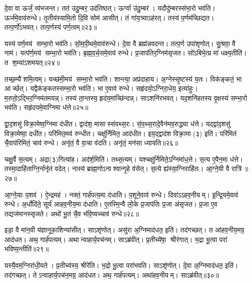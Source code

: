दे॒वा वा ऊर्जं॒ व्य॑भजन्त। तत॑ उदु॒म्बर॒ उद॑तिष्ठत्। ऊर्ग्वा उ॑दु॒म्बर॑। यदौदु॑म्बरस्संभा॒रो भव॑ति। ऊर्ज॑मे॒वाव॑रुन्धे। तृ॒तीय॑स्यामि॒तो दि॒वि सोम॑ आसीत्। तं गा॑य॒त्र्याऽह॑रत्। तस्य॑ प॒र्णम॑च्छिद्यत। तत्प॒र्णो॑ऽभवत्। तत्प॒र्णस्य॑ पर्ण॒त्वम्॥२३॥

यस्य॑ पर्ण॒मय॑ सम्भा॒रो भव॑ति। सो॒म॒पी॒थमे॒वाव॑रुन्धे। दे॒वा वै ब्रह्म॑न्नवदन्त। तत्प॒र्ण उपा॑शृणोत्। सु॒श्रवा॒ वै नाम॑। यत्प॑र्ण॒मय॑ सम्भा॒रो भव॑ति। ब्र॒ह्म॒व॒र्च॒समे॒वाव॑ रुन्धे। प्र॒जाप॑तिर॒ग्निम॑सृजत। सो॑ऽबिभे॒त्प्र मा॑ धक्ष्य॒तीति॑। त श॒म्या॑ऽशमयत्॥२४॥

तच्छ॒म्यै॑ शमि॒त्वम्। यच्छ॑मी॒मय॑ सम्भा॒रो भव॑ति। शान्त्या॒ अप्र॑दाहाय। अ॒ग्नेस्सृ॒ष्टस्य॑ य॒तः। विक॑ङ्कतं॒ भा आर्च्छत्। यद्वैक॑ङ्कतस्सम्भा॒रो भव॑ति। भा ए॒वाव॑ रुन्धे। सहृ॑दयो॒ऽग्निरा॒धेय॒ इत्या॑हुः। म॒रुतो॒ऽद्भिर॒ग्निम॑तमयन्न्। तस्य॑ ता॒न्तस्य॒ हृद॑य॒माच्छि॑न्दन्न्। साऽशनि॑रभवत्। यद॒शनि॑हतस्य वृ॒क्षस्य॑ सम्भा॒रो भव॑ति। सहृ॑दयमे॒वाग्निमा ध॑त्ते॥२५॥

द्वा॒द॒शसु॑ विक्रा॒मेष्व॒ग्निमा द॑धीत। द्वाद॑श॒ मासास्संवथ्स॒रः। सं॒व॒थ्स॒रादे॒वैन॑मव॒रुद्ध्या ध॑त्ते। यद्द्वा॑द॒शसु॑ विक्रा॒मेष्वा॒ दधी॑त। परि॑मित॒मव॑ रुन्धीत। चक्षु॑र्निमित॒ आद॑धीत। इय॒द्द्वाद॑श विक्रा॒मा (३) इति॑। परि॑मितं चै॒वाप॑रिमितं॒ चाव॑ रुन्धे। अनृ॑तं॒ वै वा॒चा व॑दति। अनृ॑तं॒ मन॑सा ध्यायति॥२६॥

चक्षु॒र्वै स॒त्यम्। अद्रा(३)गित्या॑ह। अद॑र्\mbox{}श॒मिति॑। तथ्स॒त्यम्। यश्चक्षु॑र्निमिते॒ऽग्निमा॑ध॒त्ते। स॒त्य ए॒वैन॒मा ध॑त्ते। तस्मा॒दाहि॑ताग्नि॒र्नानृ॑तं वदेत्। नास्य॑ ब्राह्म॒णोऽनाश्वान्गृ॒हे व॑सेत्। स॒त्ये ह्य॑स्या॒ग्निराहि॑तः। आ॒ग्ने॒यी वै रात्रि॑॥२७॥

आ॒ग्ने॒याः प॒शव॑। ऐ॒न्द्रमह॑। नक्तं॒ गार्\mbox{}ह॑पत्य॒मा द॑धाति। प॒शूने॒वाव॑ रुन्धे। दिवा॑ऽऽहव॒नीयम्। इ॒न्द्रि॒यमे॒वाव॑ रुन्धे। अ॒र्धोदि॑ते॒ सूर्य॑ आहव॒नीय॒मा द॑धाति। ए॒तस्मि॒न्वै लो॒के प्र॒जाप॑तिः प्र॒जा अ॑सृजत। प्र॒जा ए॒व तद्यज॑मानस्सृजते। अथो॑ भू॒तं चै॒व भ॑वि॒ष्यच्चाव॑ रुन्धे॥२८॥

इडा॒ वै मा॑न॒वी य॑ज्ञानूका॒शिन्या॑सीत्। साऽशृ॑णोत्। असु॑रा अ॒ग्निमाद॑धत॒ इति॑। तद॑गच्छत्। त आ॑हव॒नीय॒मग्र॒ आद॑धत। अथ॒ गार्\mbox{}ह॑पत्यम्। अथान्वाहार्य॒पच॑नम्। साऽब्र॑वीत्। प्र॒तीच्ये॑षा॒ श्रीर॑गात्। भ॒द्रा भू॒त्वा परा॑ भविष्य॒न्तीति॑॥२९॥

यस्यै॒वम॒ग्निरा॑धी॒यते। प्र॒तीच्य॑स्य॒ श्रीरे॑ति। भ॒द्रो भू॒त्वा परा॑भवति। साऽशृ॑णोत्। दे॒वा अ॒ग्निमाद॑धत॒ इति॑। तद॑गच्छत्। तेऽन्वाहार्य॒पच॑न॒मग्र॒ आद॑धत। अथ॒ गार्\mbox{}ह॑पत्यम्। अथा॑हव॒नीयम्। साऽब्र॑वीत्॥३०॥

